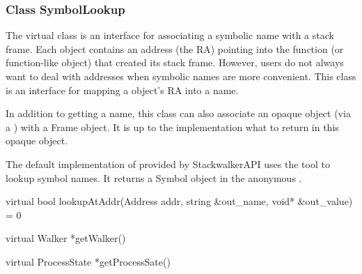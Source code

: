 \subsubsection{Class SymbolLookup}

The  virtual class is an interface for associating a symbolic
name with a stack frame. Each  object contains an address (the RA)
pointing into the function (or function-like object) that created its stack
frame. However, users do not always want to deal with addresses when symbolic
names are more convenient. This class is an interface for mapping a  object's RA into a name.

In addition to getting a name, this class can also associate an opaque object
(via a ) with a Frame object. It is up to the 
implementation what to return in this opaque object.

The default implementation of  provided by StackwalkerAPI
uses the  tool to lookup symbol names. It returns a Symbol
object in the anonymous .

\begin{apient}
virtual bool lookupAtAddr(Address addr, 
                          string &out_name, 
                          void* &out_value) = 0
\end{apient}

\begin{apient}
virtual Walker *getWalker()
\end{apient}

\begin{apient}
virtual ProcessState *getProcessSate()
\end{apient}

